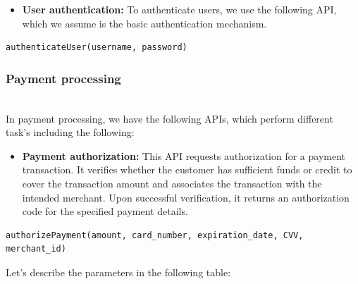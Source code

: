 \begin{itemize}
\item
\protect{}\label{lfkGNFzeOlJGdVMKSK0co}
\textbf{User authentication:} To authenticate users, we use the following API, which we assume is the basic authentication mechanism.
\end{itemize}

\begin{lstlisting}[language=plaintext]
authenticateUser(username, password)
\end{lstlisting}

\subsubsection{Payment processing}\label{hlEdLx_mAmGR_mX544Zu6}
\\
In payment processing, we have the following APIs, which perform different task's including the following:

\begin{itemize}
\item
\protect{}\label{awt_lJ-8QOin-24CI4VMy}
\textbf{Payment authorization:} This API requests authorization for a payment transaction. It verifies whether the customer has sufficient funds or credit to cover the transaction amount and associates the transaction with the intended merchant. Upon successful verification, it returns an authorization code for the specified payment details.
\end{itemize}

\begin{lstlisting}[language=plaintext]
authorizePayment(amount, card_number, expiration_date, CVV, merchant_id)
\end{lstlisting}

Let's describe the parameters in the following table:

\begin{table}[htbp]
\centering
\small
{}
\end{table}

